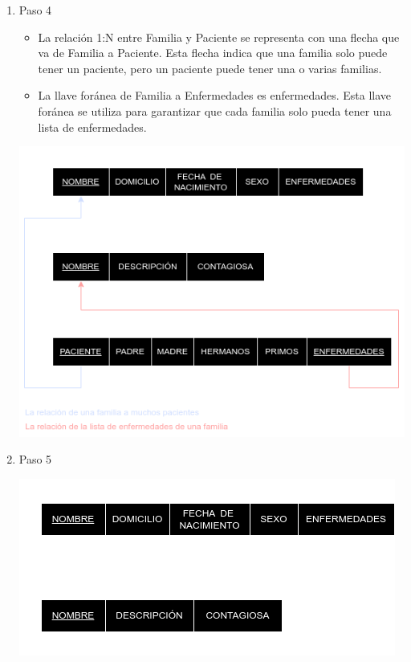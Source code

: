 \documentclass[a4paper,12pt]{article}
\begin{document}
\begin{enumerate}
  \item[] Paso 4
  \begin{itemize}
    \item[] La relación 1:N entre Familia y Paciente se representa con una flecha que va de
            Familia a Paciente. Esta flecha indica que una familia solo puede tener un paciente,
            pero un paciente puede tener una o varias familias.
    \item[] La llave foránea de Familia a Enfermedades es enfermedades. Esta llave foránea se 
            utiliza para garantizar que cada familia solo pueda tener una lista de enfermedades.         

  \end{itemize}
  \begin{center}
    \includegraphics[scale = .5]{IMA/E2P4.png}
  \end{center}
  
  \item[] Paso 5
  \thispagestyle{fancy} %
  \begin{center}
    \includegraphics[scale = .5]{IMA/E2P5.png}
  \end{center}


\end{enumerate}
\end{document}
